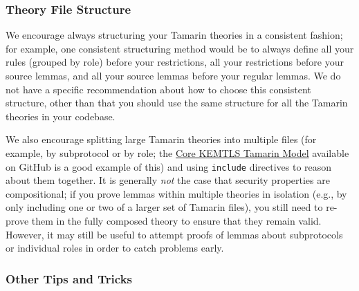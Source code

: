 \subsubsection{Theory File Structure}

We encourage always structuring your Tamarin theories in a consistent fashion; for example, one consistent structuring method would be to always define all your rules (grouped by role) before your restrictions, all your restrictions before your source lemmas, and all your source lemmas before your regular lemmas. We do not have a specific recommendation about how to choose this consistent structure, other than that you should use the same structure for all the Tamarin theories in your codebase.

We also encourage splitting large Tamarin theories into multiple files (for example, by subprotocol or by role; the \href{https://github.com/kemtls/Tamarin-multi-stage-model}{Core KEMTLS Tamarin Model} available on GitHub is a good example of this) and using \texttt{include} directives to reason about them together. It is generally \emph{not} the case that security properties are compositional; if you prove lemmas within multiple theories in isolation (e.g., by only including one or two of a larger set of Tamarin files), you still need to re-prove them in the fully composed theory to ensure that they remain valid. However, it may still be useful to attempt proofs of lemmas about subprotocols or individual roles in order to catch problems early.

\subsubsection{Other Tips and Tricks}

